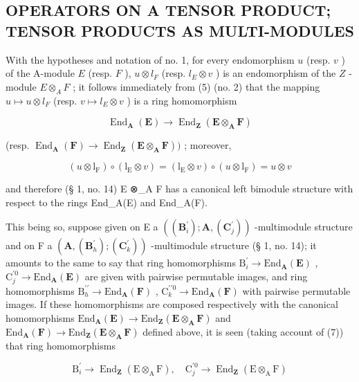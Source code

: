\subsection{OPERATORS ON A TENSOR PRODUCT; TENSOR PRODUCTS AS MULTI-MODULES}

With the hypotheses and notation of no. 1, for every endomorphism \(u\) (resp. \(v\) ) of the A-module \(E\) (resp. \(F\) ), \(u \otimes l_F\) (resp. \(l_E \otimes v\) ) is an endomorphism of the \(Z\) -module \(E \otimes_A F\) ; it follows immediately from (5) (no. 2) that the mapping \(u \mapsto u \otimes l_F\) (resp. \(v \mapsto l_E \otimes v\) ) is a ring homomorphism

\[
\operatorname{End} _ {\mathbf {A}} (\mathbf {E}) \rightarrow \operatorname{End} _ {\mathbf {Z}} (\mathbf {E} \otimes_ {\mathbf {A}} \mathbf {F})
\]

(resp. \(\operatorname{End}_{\mathbf{A}}(\mathbf{F}) \to \operatorname{End}_{\mathbf{Z}}(\mathbf{E} \otimes_{\mathbf{A}} \mathbf{F}))\) ; moreover,

\[
(u \otimes \mathrm{l} _ {\mathrm{F}}) \circ (\mathrm{l} _ {\mathrm{E}} \otimes v) = (\mathrm{l} _ {\mathrm{E}} \otimes v) \circ (u \otimes \mathrm{l} _ {\mathrm{F}}) = u \otimes v\tag{7}
\]

and therefore (§ 1, no. 14) E ⊗\_A F has a canonical left bimodule structure with respect to the rings End\_A(E) and End\_A(F).

This being so, suppose given on E a \(((\mathbf{B}_i^{\prime});\mathbf{A},(\mathbf{C}_j^{\prime}))\) -multimodule structure and on F a \((\mathbf{A},(\mathbf{B}_h^{\prime});(\mathbf{C}_k^{\prime}))\) -multimodule structure (§ 1, no. 14); it amounts to the same to say that ring homomorphisms \(\mathrm{B}_i^\prime \to \mathrm{End}_{\mathbf{A}}(\mathbf{E})\) , \(\mathrm{C}_j^{\prime 0} \to \mathrm{End}_{\mathbf{A}}(\mathbf{E})\) are given with pairwise permutable images, and ring homomorphisms \(\mathrm{B}_h^{\prime \prime} \to \mathrm{End}_{\mathbf{A}}(\mathbf{F})\) , \(\mathrm{C}_k^{\prime \prime 0} \to \mathrm{End}_{\mathbf{A}}(\mathbf{F})\) with pairwise permutable images. If these homomorphisms are composed respectively with the canonical homomorphisms \(\mathrm{End}_{\mathbf{A}}(\mathbf{E}) \to \mathrm{End}_{\mathbf{Z}}(\mathbf{E} \otimes_{\mathbf{A}} \mathbf{F})\) and \(\mathrm{End}_{\mathbf{A}}(\mathbf{F}) \to \mathrm{End}_{\mathbf{Z}}(\mathbf{E} \otimes_{\mathbf{A}} \mathbf{F})\) defined above, it is seen (taking account of (7)) that ring homomorphisms

\[
\mathrm{B} _ {i} ^ {\prime} \rightarrow \operatorname{End} _ {\mathbf {Z}} (\mathrm{E} \otimes_ {\mathrm{A}} \mathrm{F}), \quad \mathrm{C} _ {j} ^ {\prime 0} \rightarrow \operatorname{End} _ {\mathbf {Z}} (\mathrm{E} \otimes_ {\mathrm{A}} \mathrm{F})
\]

